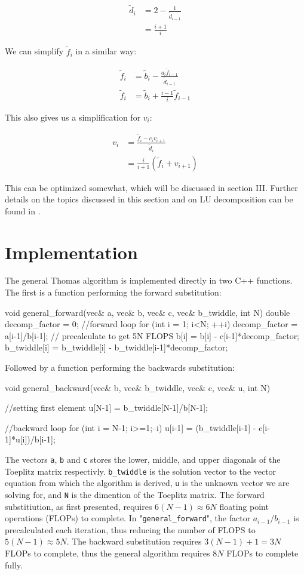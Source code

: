 \documentclass[english,notitlepage,reprint,nofootinbib]{revtex4-1}  %
\begin{document}
\begin{align*}
\tilde{d}_i &= 2 - \frac{1}{\tilde{d}_{i-1}} \\
&= \frac{i+1}{i}
\end{align*}

We can simplify $\tilde{f}_i$ in a similar way:

\begin{align*}
\tilde{f}_i &= \tilde{b}_i - \frac{a_i \tilde{f}_{i-1}}{\tilde{d}_{i-1}} \\
\tilde{f}_i &= \tilde{b}_i + \frac{i-1}{i}\tilde{f}_{i-1}
\end{align*}

This also gives us a simplification for $v_i$:

\begin{align*}
v_i &= \frac{\tilde{f}_i - c_i v_{i+1}}{\tilde{d}_i} \\
&= \frac{i}{i+1}(\tilde{f}_i + v_{i+1})
\end{align*}

This can be optimized somewhat, which will be discussed in section III. Further details on the topics discussed in this section and on LU decomposition can be found in \citep{Hjorth-Jensen2015}.

\newpage


\section{Implementation} \label{sec:III}
The general Thomas algorithm is implemented directly in two C++ functions. The first is a function performing the forward substitution:
\begin{cpp}
void general_forward(vec& a, vec& b, vec& c, vec& b_twiddle, int N)
{
  double decomp_factor = 0;
  //forward loop
  for (int i = 1; i<N; ++i){
    decomp_factor = a[i-1]/b[i-1];  // precalculate to get 5N FLOPS
    b[i] = b[i] - c[i-1]*decomp_factor;
    b_twiddle[i] = b_twiddle[i] - b_twiddle[i-1]*decomp_factor;
  }
}
\end{cpp}
Followed by a function performing the backwards substitution:
\begin{cpp}
void general_backward(vec& b, vec& b_twiddle, vec& c, vec& u, int N)
{
  //setting first element
  u[N-1] = b_twiddle[N-1]/b[N-1];

  //backward loop
  for (int i = N-1; i>=1;--i){
    u[i-1] = (b_twiddle[i-1] - c[i-1]*u[i])/b[i-1];
  }
}
\end{cpp}
The vectors \verb+a+, \verb+b+ and \verb+c+ stores the lower, middle, and upper diagonals of the Toeplitz matrix respectivly. \verb+b_twiddle+ is the solution vector to the vector equation from which the algorithm is derived, \verb+u+ is the unknown vector we are solving for, and \verb+N+ is the dimention of the Toeplitz matrix. The forward substitiution, as first presented, requires \(6(N-1)\approx 6N\) floating point operations (FLOPs) to complete. In "\verb+general_forward+", the factor \(a_{i-1}/b_{i-1}\) is precalculated each iteration, thus reducing the number of FLOPS to \(5(N-1)\approx 5N\). The backward substitution requires \(3(N-1)+1 = 3N\) FLOPs to complete, thus the general algorithm requires \(8N\) FLOPs to complete fully.
\end{document}
